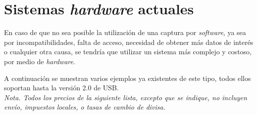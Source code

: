 \section{Sistemas \emph{hardware} actuales}
En caso de que no sea posible la utilización de una captura por \emph{software}, ya sea por incompatibilidades, falta de acceso, necesidad de obtener más datos de interés o cualquier otra causa, se tendría que utilizar un sistema más complejo y costoso, por medio de \emph{hardware}.

A continuación se muestran varios ejemplos ya existentes de este tipo, todos ellos soportan hasta la versión 2.0 de USB\cite{specification2000revision}. \\

\textit{Nota. Todos los precios de la siguiente lista, excepto que se indique, no incluyen envío, impuestos locales, o tasas de cambio de divisa.}

